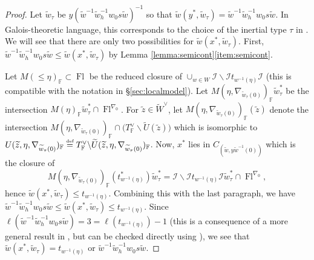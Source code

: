 \documentclass[oneside,a4paper,english, 11pt]{amsart}
\theoremstyle{plain}
\theoremstyle{plain}
\theoremstyle{plain}
\theoremstyle{plain}
\theoremstyle{plain}
\theoremstyle{plain}
\theoremstyle{definition}
\theoremstyle{definition}
\theoremstyle{definition}
\theoremstyle{remark}
\numberwithin{equation}{section}
\newcommand{\F}{\mathbb{F}}
\newcommand{\cI}{\mathcal{I}}
\newcommand{\tld}[1]{\widetilde{#1}}
\newcommand{\defeq}{\stackrel{\textrm{\tiny{def}}}{=}}
\DeclareMathOperator{\Fl}{Fl}
\begin{document}
\begin{proof}
%
Let $\tld{w}_\tau$ be $y (\tld{w}^{-1}\tld{w}_h^{-1} w_0 s \tld{w})^{-1}$ so that $\tld{w}(y^*,\tld{w}_\tau) = \tld{w}^{-1}\tld{w}_h^{-1} w_0 s \tld{w}$. 
In Galois-theoretic language, this corresponds to the choice of the inertial type $\tau$ in \cite[Proposition 7.16(3)]{LLLM}. 
We will see that there are only two possibilities for $\tld{w}(x^*,\tld{w}_\tau)$.
First, $\tld{w}^{-1}\tld{w}_h^{-1} w_0 s \tld{w} \leq \tld{w}(x^*,\tld{w}_\tau)$ by Lemma \ref{lemma:semicont}\eqref{item:semicont}. 

Let $M(\leq\eta)_{\F} \subset \Fl$ be the reduced closure of $\cup_{w\in W} \cI\backslash \cI t_{w^{-1}(\eta)} \cI$ (this is compatible with the notation in \S \ref{sec:localmodel}). 
Let $M(\eta,\nabla_{\tld{w}_\tau(0)})_{\F}\tld{w}_\tau^*$ be the intersection $M(\eta)_{\F}\tld{w}_\tau^* \cap \Fl^{\nabla_0}$. 
For $\tld{z} \in \tld{W}^\vee$, let $M(\eta,\nabla_{\tld{w}_\tau(0)})_{\F}(\tld{z})$ denote the intersection $M(\eta,\nabla_{\tld{w}_\tau(0)})_{\F} \cap \big(T_{\F}^{\vee}\backslash\tld{U}(\tld{z})\big)$ which is isomorphic to $U(\tld{z},\eta,\nabla_{\tld{w}_\tau(0)})_{\F}\defeq T^{\vee}_{\F}\backslash\tld{U}(\tld{z},\eta,\nabla_{\tld{w}_\tau(0)})_{\F}$. 
%
Now, $x^*$ lies in $C_{(\tld{w},y\tld{w}^{-1}(0))}$ which is the closure of $$M(\eta,\nabla_{\tld{w}_\tau(0)})_\F(t_{w^{-1}(\eta)}^*)\tld{w}_\tau^*=\cI\backslash\cI t_{w^{-1}(\eta)} \cI\tld{w}^*_{\tau}\cap \Fl^{\nabla_0},$$ hence $\tld{w}(x^*,\tld{w}_\tau) \leq t_{w^{-1}(\eta)}$. 
Combining this with the last paragraph, we have $\tld{w}^{-1}\tld{w}_h^{-1} w_0 s \tld{w} \leq \tld{w}(x^*,\tld{w}_\tau)\leq t_{w^{-1}(\eta)}$. 
Since $\ell(\tld{w}^{-1}\tld{w}_h^{-1} w_0 s \tld{w}) = 3 = \ell(t_{w^{-1}(\eta)}) - 1$ (this is a consequence of a more general result in \cite{OBW}, but can be checked directly using \cite[Table 1]{LLLM}), we see that $\tld{w}(x^*,\tld{w}_\tau) = t_{w^{-1}(\eta)}$ or $\tld{w}^{-1}\tld{w}_h^{-1} w_0 s \tld{w}$. 


\end{proof}
\end{document}
